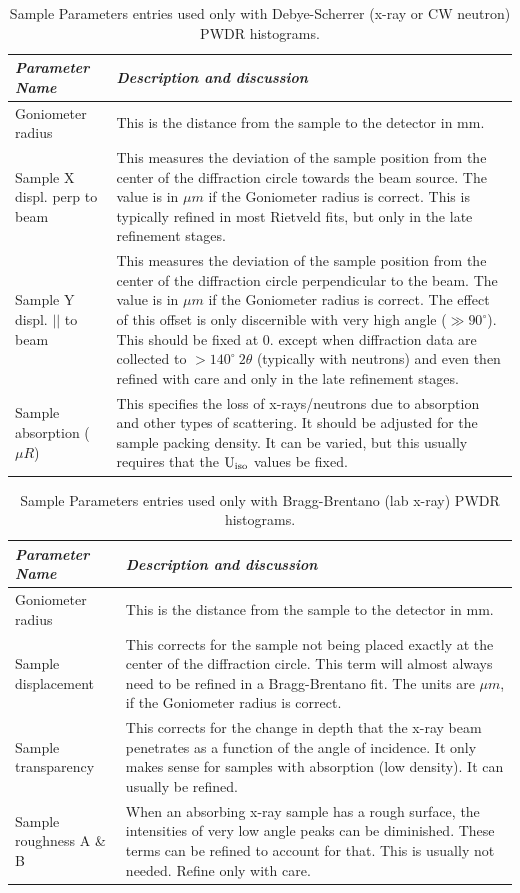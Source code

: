 \begin{table}
\centering
\caption{Sample Parameters entries used only with Debye-Scherrer (x-ray or CW neutron) PWDR histograms.}
\label{tab:SpecialSample1}
\begin{tabular}{| l | p{} |}
\hline
\textit{Parameter Name} & \textit{Description and discussion} \\
\hline
Goniometer radius& This is the distance from the sample to the detector in mm.\\
\hline
Sample X displ. perp to beam & This measures the deviation of the sample position from the center of the diffraction circle towards the beam source. The value is in $\mu m$ if the Goniometer radius is correct. This is typically refined in most Rietveld fits, but only in the late refinement stages.  \\
\hline
Sample Y displ. $||$ to beam & This measures the deviation of the sample position from the center of the diffraction circle perpendicular to the beam. The value is in $\mu m$ if the Goniometer radius is correct. The effect of this offset is only discernible with very high angle ($\gg 90^\circ$). This should be fixed at 0. except when diffraction data are collected to $>140^\circ\ 2\theta$ (typically with neutrons) and even then refined with care and only in the late refinement stages. \\
\hline
Sample absorption ($\mu R$)& This specifies the loss of x-rays/neutrons due to absorption and other types of scattering. It should be adjusted for the sample packing density. It can be varied, but this usually requires that the $\rm U_{iso}$ values be fixed. \\
\hline
\end{tabular}
\end{table}

\begin{table}
\centering
\caption{Sample Parameters entries used only with Bragg-Brentano (lab x-ray) PWDR histograms.}
\label{tab:SpecialSample2}
\begin{tabular}{| l | p{} |}
\hline
\textit{Parameter Name} & \textit{Description and discussion} \\
\hline
Goniometer radius& This is the distance from the sample to the detector in mm.\\
\hline
Sample displacement& This corrects for the sample not being placed exactly at the center of the diffraction circle. This term will almost always need to be refined in a Bragg-Brentano fit. The units are $\mu m$, if the Goniometer radius is correct.\\
\hline
Sample transparency& This corrects for the change in depth that the x-ray beam penetrates as a function of the angle of incidence. It only makes sense for samples with absorption (low density). It can usually be refined.\\
\hline
Sample roughness A \& B& When an absorbing x-ray sample has a rough surface, the intensities of very low angle peaks can be diminished. These terms can be refined to account for that. This is usually not needed. Refine only with care. \\
\hline
\end{tabular}
\end{table}

